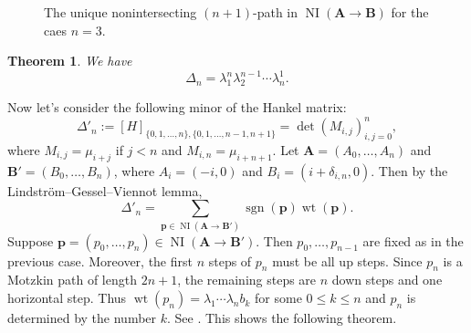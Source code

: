 \documentclass[oneside]{book}
\numberwithin{equation}{section}
\newtheorem{thm}{Theorem}[section]
\theoremstyle{definition}
\newcommand\NI{\operatorname{NI}}
\newcommand\sgn{\operatorname{sgn}}
\newcommand\wt{\operatorname{wt}}
\renewcommand\vec[1]{\mathbf{#1}}
\newcommand\dlabel[3]{\node at (#1+0.7,#2-0.3) {\( #3 \)};}
\begin{document}
\begin{figure}
  \centering
{}
\caption{The unique nonintersecting \( (n+1) \)-path in
  \( \NI(\vec A \to \vec B) \) for the caes \( n=3 \).}
  \label{fig:14}
\end{figure}

\begin{thm}\label{thm:8}
  We have
  \[
    \Delta_n = \lambda_1^n \lambda_2^{n-1} \cdots \lambda_n^1.
  \]
\end{thm}


Now let's consider the following minor of the Hankel matrix:
\[
 \Delta'_n := [H]_{\{0,1,\dots,n\},\{0,1,\dots,n-1,n+1\}} = \det(M_{i,j})_{i,j=0}^n,
\]
where \( M_{i,j} = \mu_{i+j} \) if \( j<n \) and
\( M_{i,n} = \mu_{i+n+1} \). Let \( \vec A = (A_0,\dots,A_n) \) and
\( \vec B' = (B_0,\dots,B_n) \), where \( A_i = (-i,0) \) and
\( B_i = (i + \delta_{i,n},0) \). Then by the
Lindstr\"om--Gessel--Viennot lemma,
\[
  \Delta'_n = \sum_{\vec p \in \NI(\vec A \to \vec B')} \sgn(\vec p)
  \wt(\vec p).
\]
Suppose \( \vec p = (p_0,\dots,p_n)\in \NI(\vec A \to \vec B') \).
Then \( p_0,\dots,p_{n-1} \) are fixed as in the previous case.
Moreover, the first \( n \) steps of \( p_n \) must be all up steps.
Since \( p_n \) is a Motzkin path of length \( 2n+1 \), the remaining
steps are \( n \) down steps and one horizontal step. Thus
\( \wt(p_n) = \lambda_1 \cdots \lambda_n b_k \) for some
\( 0\le k\le n \) and \( p_n \) is determined by the number \( k \).
See . This shows the following theorem.
\end{document}
